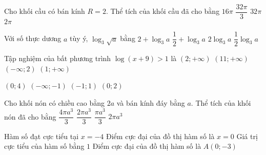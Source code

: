 \begin{ex}%
Cho khối cầu có bán kính $R=2$. Thể tích của khối cầu đã cho bằng
\choice
{$16\pi$}
{\True $\dfrac{32\pi}{3}$}
{$32\pi$}
{$2\pi$}

\end{ex}
\begin{ex}%
Với số thực dương $a$ tùy ý, $\log_3 \sqrt{a}$ bằng
\choice
{$2+\log_3 a$}
{$\dfrac{1}{2}+\log_3 a$}
{$2\log_3 a$}
{\True $\dfrac{1}{2} \log_3 a$}

\end{ex}
\begin{ex}%
Tập nghiệm của bất phương trình $\log (x+9)>1$ là
\choice
{$(2;+\infty)$}
{$(11;+\infty)$}
{$(-\infty; 2)$}
{\True $(1;+\infty)$}

\end{ex}
\begin{ex}%
{\vspace{-0.4cm}

}
\choice
{$(0; 4)$}
{$(-\infty;-1)$}
{\True $(-1; 1)$}
{$(0; 2)$}
\end{ex}
\begin{ex}%
Cho khối nón có chiều cao bằng $2 a$ và bán kính đáy bằng $a$. Thể tích của khối nón đã cho bằng
\choice
{$\dfrac{4\pi a^3}{3}$}
{\True $\dfrac{2\pi a^3}{3}$}
{$\dfrac{\pi a^3}{3}$}
{$2\pi a^3$}

\end{ex}
\begin{ex}%
{
}
\choice
{Hàm số đạt cực tiểu tại $x=-4$}
{Điểm cực đại của đồ thị hàm số là $x=0$}
{Giá trị cực tiểu của hàm số bằng $1$}
{\True Điểm cực đại của đồ thị hàm số là $A(0;-3)$}
\end{ex}
